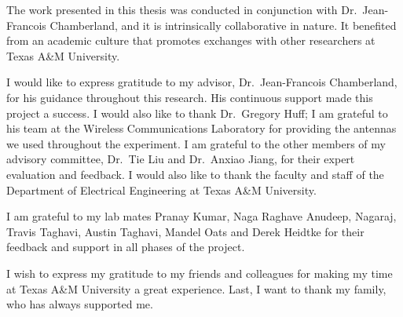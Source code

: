 \TAMUAcknowledgmentFormat

The work presented in this thesis was conducted in conjunction with Dr.~Jean-Francois Chamberland, and it is intrinsically collaborative in nature.
It benefited from an academic culture that promotes exchanges with other researchers at Texas A\&M University.

I would like to express gratitude to my advisor, Dr.~Jean-Francois Chamberland, for his guidance throughout this research.
His continuous support made this project a success. 
I would also like to thank Dr.~Gregory Huff; I am grateful to his team at the Wireless Communications Laboratory for providing the antennas we used throughout the experiment.
I am grateful to the other members of my advisory committee, Dr.~Tie Liu and Dr.~Anxiao Jiang, for their expert evaluation and feedback.
I would also like to thank the faculty and staff of the Department of Electrical Engineering at Texas A\&M University.

I am grateful to my lab mates Pranay Kumar, Naga Raghave Anudeep, Nagaraj, Travis Taghavi, Austin Taghavi, Mandel Oats and Derek Heidtke for their feedback and support in all phases of the project.

I wish to express my gratitude to my friends and colleagues for making my time
at Texas A\&M University a great experience. Last, I want to thank
my family, who has always supported me.

